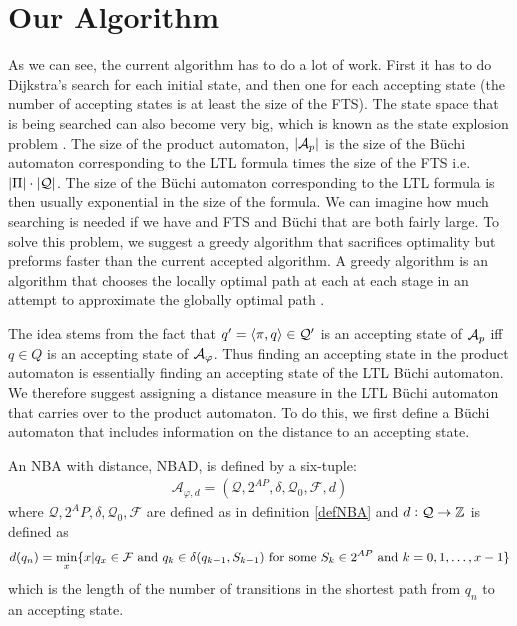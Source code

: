 \section{Our Algorithm}
As we can see, the current algorithm has to do a lot of work. First it has to do Dijkstra's search for each initial state, and then one for each accepting state (the number of accepting states is at least the size of the FTS). The state space that is being searched can also become very big, which is known as the state explosion problem \cite{clarke99}. The size of the product automaton, $|\mathcal{A}_p|$ is the size of the B\"{u}chi automaton corresponding to the LTL formula times the size of the FTS i.e.\ $|\Pi| \cdot |\mathcal{Q}|$. The size of the B\"{u}chi automaton corresponding to the LTL formula is then usually exponential in the size of the formula. We can imagine how much searching is needed if we have and FTS and B\"{u}chi that are both fairly large. To solve this problem, we suggest a greedy algorithm that sacrifices optimality but preforms faster than the current accepted algorithm. A greedy algorithm is an algorithm that chooses the locally optimal path at each at each stage in an attempt to approximate the globally optimal path \cite{corman01}.

The idea stems from the fact that $q' = \langle \pi, q \rangle \in \mathcal{Q}'$ is an accepting state of $\mathcal{A}_p$ iff $q \in Q$ is an accepting state of $\mathcal{A}_\varphi$. Thus finding an accepting state in the product automaton is essentially finding an accepting state of the LTL B\"{u}chi automaton. We therefore suggest assigning a distance measure in the LTL B\"{u}chi automaton that carries over to the product automaton. To do this, we first define a B\"{u}chi automaton that includes information on the distance to an accepting state.

\begin{definition}
\label{defBWD}
An NBA with distance, NBAD, is defined by a six-tuple:
\begin{align*}
\mathcal{A}_{\varphi,d} = (\mathcal{Q},2^{AP},\delta,\mathcal{Q}_0,\mathcal{F},d)
\end{align*}
where $\mathcal{Q},2^AP,\delta,\mathcal{Q}_0,\mathcal{F}$ are defined as in definition \ref{defNBA} and $d:\mathcal{Q} \rightarrow \mathbb{Z}$ is defined as 
\begin{align*}
d(q_n) = \min_x \{x | q_x \in \mathcal{F} \text{ and } q_k \in \delta(q_{k-1},S_{k-1}) \text{ for some } S_k \in 2^{AP} \text{ and } k = 0,1,\dots, x-1 \}
\end{align*}
which is the length of the number of transitions in the shortest path from $q_n$ to an accepting state.
\end{definition}

